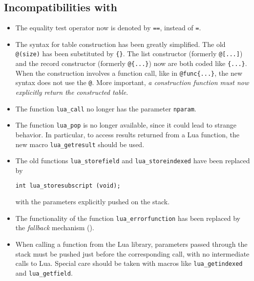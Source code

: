 \subsection*{Incompatibilities with }
\begin{itemize}
\item
The equality test operator now is denoted by \verb'==',
instead of \verb'='.
\item
The syntax for table construction has been greatly simplified.
The old \verb'@(size)' has been substituted by \verb'{}'.
The list constructor (formerly \verb'@[...]') and the record
constructor (formerly \verb'@{...}') now are both coded like
\verb'{...}'.
When the construction involves a function call,
like in \verb'@func{...}',
the new syntax does not use the \verb'@'.
More important, {\em a construction function must now
explicitly return the constructed table}.
\item
The function \verb'lua_call' no longer has the parameter \verb'nparam'.
\item
The function \verb'lua_pop' is no longer available,
since it could lead to strange behavior.
In particular,
to access results returned from a Lua function,
the new macro \verb'lua_getresult' should be used.
\item
The old functions \verb'lua_storefield' and \verb'lua_storeindexed'
have been replaced by
\begin{verbatim}
int lua_storesubscript (void);
\end{verbatim}
with the parameters explicitly pushed on the stack.
\item
The functionality of the function \verb'lua_errorfunction' has been
replaced by the {\em fallback} mechanism ().
\item
When calling a function from the Lua library,
parameters passed through the stack
must be pushed just before the corresponding call,
with no intermediate calls to Lua.
Special care should be taken with macros like
\verb'lua_getindexed' and \verb'lua_getfield'.
\end{itemize}

\newcommand{\indexentry}[2]{\item {#1} #2}
\begin{theindex}

\end{theindex}

\pagebreak
\tableofcontents


